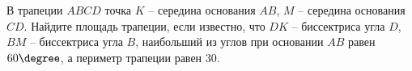 \begin{ex}
	\begin{condition}
		В трапеции \( ABCD  \) точка \( K \) – середина основания \( AB \), \( M  \) – середина основания \( CD \). Найдите площадь трапеции, если известно, что \( DK \) – биссектриса угла \( D \), \( BM \) – биссектриса угла \( B \), наибольший из углов при основании \( AB  \) равен \( 60\degree\), а периметр трапеции равен \( 30 \).
	\end{condition}
\end{ex}